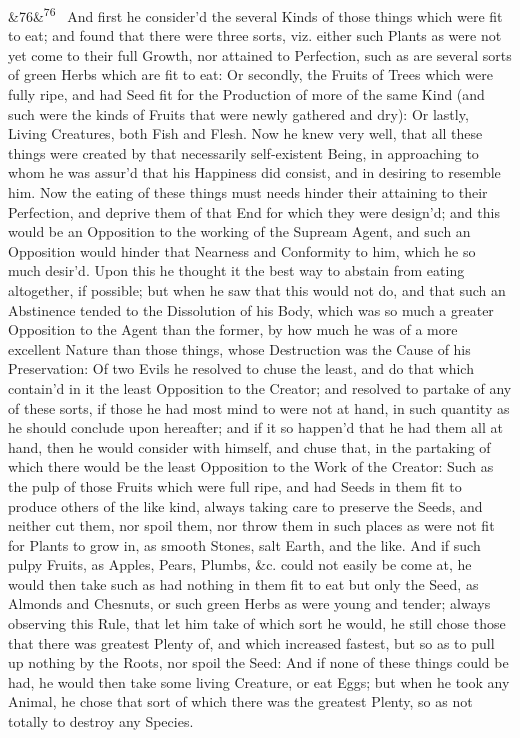\documentclass[12pt]{article}
\newcommand{\para}[1][]{\par\noindent\ifx&#1&\else\textsuperscript{\footnotesize #1}~\fi}
\begin{document}
\para[76] And first he consider'd the several Kinds of those things which were fit to eat; and found that there were three sorts, viz. either such Plants as were not yet come to their full Growth, nor attained to Perfection, such as are several sorts of green Herbs which are fit to eat: Or secondly, the Fruits of Trees which were fully ripe, and had Seed fit for the Production of more of the same Kind (and such were the kinds of Fruits that were newly gathered and dry): Or lastly, Living Creatures, both Fish and Flesh. Now he knew very well, that all these things were created by that necessarily self-existent Being, in approaching to whom he was assur'd that his Happiness did consist, and in desiring to resemble him. Now the eating of these things must needs hinder their attaining to their Perfection, and deprive them of that End for which they were design'd; and this would be an Opposition to the working of the Supream Agent, and such an Opposition would hinder that Nearness and Conformity to him, which he so much desir'd. Upon this he thought it the best way to abstain from eating altogether, if possible; but when he saw that this would not do, and that such an Abstinence tended to the Dissolution of his Body, which was so much a greater Opposition to the Agent than the former, by how much he was of a more excellent Nature than those things, whose Destruction was the Cause of his Preservation: Of two Evils he resolved to chuse the least, and do that which contain'd in it the least Opposition to the Creator; and resolved to partake of any of these sorts, if those he had most mind to were not at hand, in such quantity as he should conclude upon hereafter; and if it so happen'd that he had them all at hand, then he would consider with himself, and chuse that, in the partaking of which there would be the least Opposition to the Work of the Creator: Such as the pulp of those Fruits which were full ripe, and had Seeds in them fit to produce others of the like kind, always taking care to preserve the Seeds, and neither cut them, nor spoil them, nor throw them in such places as were not fit for Plants to grow in, as smooth Stones, salt Earth, and the like. And if such pulpy Fruits, as Apples, Pears, Plumbs, \&c. could not easily be come at, he would then take such as had nothing in them fit to eat but only the Seed, as Almonds and Chesnuts, or such green Herbs as were young and tender; always observing this Rule, that let him take of which sort he would, he still chose those that there was greatest Plenty of, and which increased fastest, but so as to pull up nothing by the Roots, nor spoil the Seed: And if none of these things could be had, he would then take some living Creature, or eat Eggs; but when he took any Animal, he chose that sort of which there was the greatest Plenty, so as not totally to destroy any Species.
\end{document}
